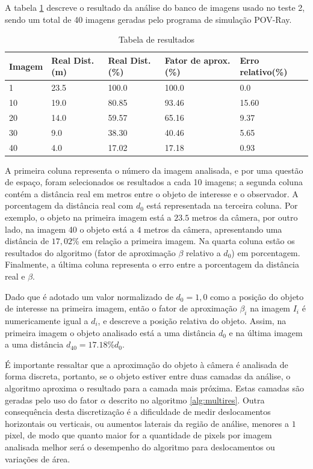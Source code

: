 A tabela \ref{tab:tab1} descreve o resultado da análise do banco 
de imagens usado no teste 2, sendo um total de 40 imagens geradas
pelo programa de simulação POV-Ray.
\begin{table}[H]
\setlength{\tabcolsep}{1 pt} 
\caption{Tabela de resultados}
\begin{tabular}{l|l|l|l|l}
Imagem & Real Dist.(m) & Real Dist.(\%) & Fator de aprox.(\%) & Erro relativo(\%)\\ \hline  \hline
1 & 23.5 & 100.0 & 100.0 & 0.0 \\ \hline
10 & 19.0 & 80.85 & 93.46 & 15.60 \\ \hline
20 & 14.0 & 59.57 & 65.16 & 9.37 \\ \hline
30 & 9.0 & 38.30 & 40.46 & 5.65 \\ \hline
40 & 4.0 & 17.02 & 17.18 & 0.93 \\ \hline
\end{tabular}
\label{tab:tab1}
\end{table}
A primeira coluna representa o número da imagem analisada, e por uma questão de espaço, foram selecionados 
os resultados a cada 10 imagens; a segunda coluna contém a distância 
real em metros entre o objeto de interesse e o observador.
A porcentagem da distância real com $d_0$ está representada na terceira coluna. Por exemplo, o objeto na primeira imagem
está a $23.5$ metros da câmera, por outro lado, na imagem 40 o objeto está a
$4$ metros da câmera, apresentando uma distância de  $17,02$\% em relação a 
primeira imagem. Na quarta coluna estão os resultados do algoritmo (fator
de aproximação $\beta$ relativo a $d_0$) em porcentagem. Finalmente, a última coluna representa o erro 
entre a porcentagem da distância real e $\beta$.

Dado que é adotado um valor normalizado de $d_0=1,0$ como a posição do objeto de interesse na primeira 
imagem, então o fator de aproximação $\beta_i$ na imagem $I_i$ é 
numericamente igual a $d_i$, e descreve a posição relativa do objeto.
Assim, na primeira imagem o objeto analisado está a uma distância $d_0$
e na última imagem a uma distância $d_{40}=17.18\%d_0$.

É importante ressaltar que a aproximação do objeto à câmera é analisada de forma discreta, 
portanto, se o objeto
estiver entre duas camadas da análise, o algoritmo aproxima o resultado para
a camada mais próxima. Estas camadas são geradas pelo uso do fator $\alpha$
descrito no algoritmo \ref{alg:multires}. Outra consequência desta discretização
é a dificuldade de medir deslocamentos horizontais ou verticais, ou aumentos laterais da região de análise,
menores a $1$ pixel, de modo que quanto maior for a quantidade de pixels por
imagem analisada melhor será o desempenho do algoritmo para deslocamentos ou variações de área.

